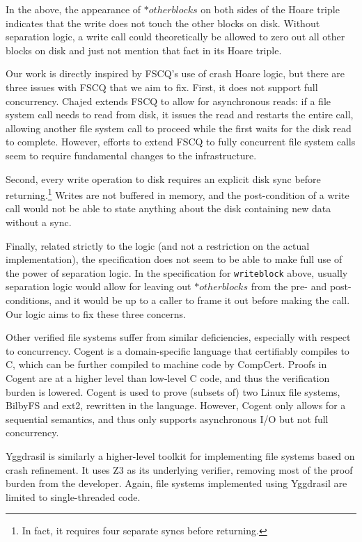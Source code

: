 In the above, the appearance of $\ast otherblocks$ on both sides of the Hoare
triple indicates that the write does not touch the other blocks on disk. Without
separation logic, a write call could theoretically be allowed to zero out all
other blocks on disk and just not mention that fact in its Hoare triple.

Our work is directly inspired by FSCQ's use of crash Hoare logic, but there are
three issues with FSCQ that we aim to fix. First, it does not support full
concurrency. Chajed\cite{chajed2017verifying} extends FSCQ to allow for
asynchronous reads: if a file system call needs to read from disk, it issues the
read and restarts the entire call, allowing another file system call to proceed
while the first waits for the disk read to complete. However, efforts to extend
FSCQ to fully concurrent file system calls seem to require fundamental changes
to the infrastructure.

Second, every write operation to disk requires an explicit disk sync before
returning.\footnote{In fact, it requires four separate syncs before returning.}
Writes are not buffered in memory, and the post-condition of a write call would
not be able to state anything about the disk containing new data without a sync.

Finally, related strictly to the logic (and not a restriction on the actual
implementation), the specification does not seem to be able to make full use of
the power of separation logic. In the specification for \texttt{writeblock}
above, usually separation logic would allow for leaving out $\ast otherblocks$
from the pre- and post-conditions, and it would be up to a caller to frame it
out before making the call. Our logic aims to fix these three concerns.

Other verified file systems suffer from similar deficiencies, especially with
respect to concurrency. Cogent\cite{amani2016cogent} is a domain-specific
language that certifiably compiles to C, which can be further compiled to
machine code by CompCert. Proofs in Cogent are at a higher level than low-level
C code, and thus the verification burden is lowered. Cogent is used to prove
(subsets of) two Linux file systems, BilbyFS and ext2, rewritten in the
language. However, Cogent only allows for a sequential semantics, and thus only
supports asynchronous I/O but not full concurrency.

Yggdrasil\cite{sigurbjarnarson2016push} is similarly a higher-level toolkit for
implementing file systems based on crash refinement. It uses Z3 as its underlying
verifier, removing most of the proof burden from the developer. Again, file
systems implemented using Yggdrasil are limited to single-threaded code.

